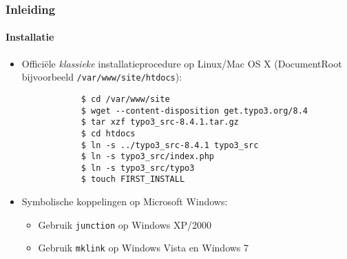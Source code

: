 \begin{frame}[fragile]
	\frametitle{Inleiding}
	\framesubtitle{Installatie}

	\begin{itemize}
		\item Officiële \textit{klassieke} installatieprocedure op Linux/Mac OS X\newline
			(DocumentRoot bijvoorbeeld \texttt{/var/www/site/htdocs}):
		\begin{lstlisting}
			$ cd /var/www/site
			$ wget --content-disposition get.typo3.org/8.4
			$ tar xzf typo3_src-8.4.1.tar.gz
			$ cd htdocs
			$ ln -s ../typo3_src-8.4.1 typo3_src
			$ ln -s typo3_src/index.php
			$ ln -s typo3_src/typo3
			$ touch FIRST_INSTALL
		\end{lstlisting}

		\item Symbolische koppelingen op Microsoft Windows:

			\begin{itemize}
				\item Gebruik \texttt{junction} op Windows XP/2000
				\item Gebruik \texttt{mklink} op Windows Vista en Windows 7
			\end{itemize}

	\end{itemize}
\end{frame}

